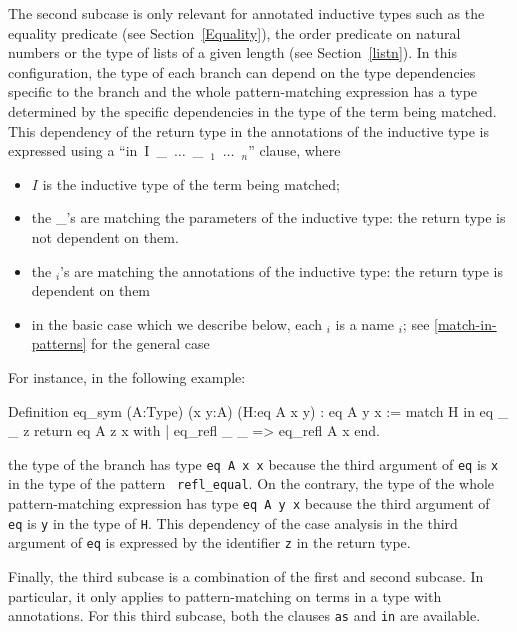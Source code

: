 The second subcase is only relevant for annotated inductive types such
as the equality predicate (see Section~\ref{Equality}), the order
predicate on natural numbers %
or the type of
lists of a given length (see Section~\ref{listn}). In this configuration,
the type of each branch can depend on the type dependencies specific
to the branch and the whole pattern-matching expression has a type
determined by the specific dependencies in the type of the term being
matched. This dependency of the return type in the annotations of the
inductive type is expressed using a 
  ``in~I~\_~$\ldots$~\_~\pattern$_1$~$\ldots$~\pattern$_n$'' clause, where
\begin{itemize}
\item $I$ is the inductive type of the term being matched;

\item the {\_}'s are matching the parameters of the inductive type:
the return type is not dependent on them.

\item the \pattern$_i$'s are matching the annotations of the inductive
  type: the return type is dependent on them

\item in the basic case which we describe below, each \pattern$_i$ is a
  name \ident$_i$; see \ref{match-in-patterns} for the general case

\end{itemize}

For instance, in the following example:
\begin{coq_example*}
Definition eq_sym (A:Type) (x y:A) (H:eq A x y) : eq A y x :=
  match H in eq _ _ z return eq A z x with
  | eq_refl _ _ => eq_refl A x
  end.
\end{coq_example*}
the type of the branch has type {\tt eq~A~x~x} because the third
argument of {\tt eq} is {\tt x} in the type of the pattern {\tt
refl\_equal}. On the contrary, the type of the whole pattern-matching
expression has type {\tt eq~A~y~x} because the third argument of {\tt
eq} is {\tt y} in the type of {\tt H}. This dependency of the case
analysis in the third argument of {\tt eq} is expressed by the
identifier {\tt z} in the return type.

Finally, the third subcase is a combination of the first and second
subcase. In particular, it only applies to pattern-matching on terms
in a type with annotations. For this third subcase, both
the clauses {\tt as} and {\tt in} are available.
 
